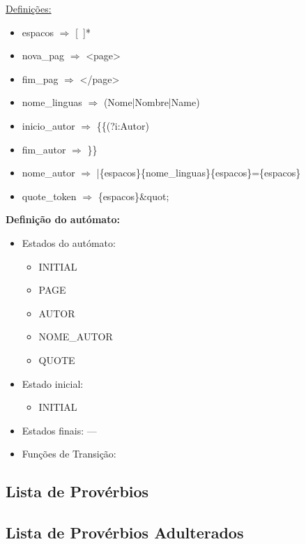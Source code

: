\documentclass[11pt,a4paper]{report}
\begin{document}
\underline{Definições: }
\begin{itemize}
	\item espacos $\Rightarrow$ [\ ]*
	\item nova\_pag $\Rightarrow$ <page>
	\item fim\_pag $\Rightarrow$ </page>
	\item nome\_linguas $\Rightarrow$ (Nome|Nombre|Name)
	\item inicio\_autor $\Rightarrow$ \{\{(?i:Autor)
	\item fim\_autor $\Rightarrow$ \}\}
	\item nome\_autor $\Rightarrow$ |\{espacos\}\{nome\_linguas\}\{espacos\}=\{espacos\}
	\item quote\_token $\Rightarrow$ \{espacos\}\&quot;
\end{itemize}

\vspace{0.5cm}

\textbf{Definição do autómato:}

\begin{itemize}
	\item Estados do autómato:
		\begin{itemize}
			\item INITIAL
			\item PAGE
			\item AUTOR
			\item NOME\_AUTOR
			\item QUOTE
		\end{itemize}
	\item Estado inicial:
		\begin{itemize}
			\item INITIAL
		\end{itemize}
	\item Estados finais:  ---
	\item Funções de Transição:
\end{itemize}


\subsection{Lista de Provérbios}


\newpage

\subsection{Lista de Provérbios Adulterados}
\end{document}
